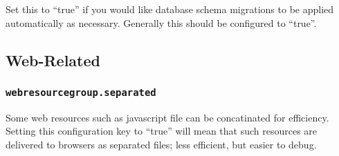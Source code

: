 Set this to ``true'' if you would like database schema migrations to be applied automatically as necessary.  Generally this should be configured to ``true''.

\subsection{Web-Related}

\subsubsection{\tt webresourcegroup.separated}

Some web resources such as javascript file can be concatinated for efficiency.  Setting this configuration key to ``true'' will mean that such resources are delivered to browsers as separated files; less efficient, but easier to debug.
